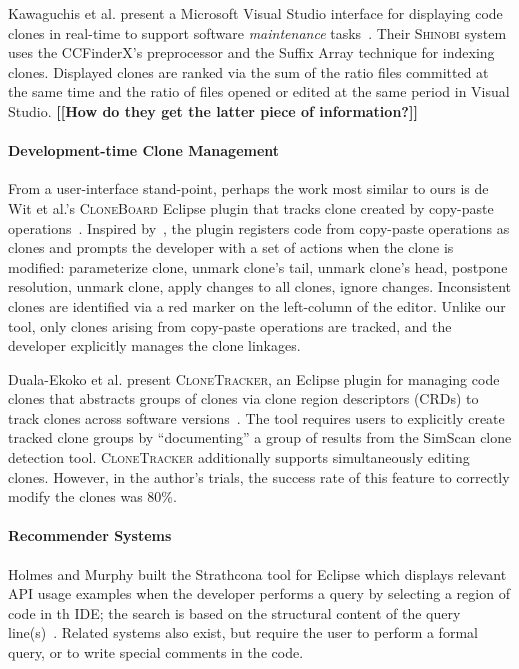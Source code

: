 \documentclass[preprint,10pt]{sigplanconf}
\newcommand{\todo}[1]{{\bfseries [[#1]]}}
\begin{document}
Kawaguchis et al. present a  
Microsoft Visual Studio interface for
displaying code clones in real-time to support software
\emph{maintenance} tasks~\cite{Kawaguchi2009,Yamashina2008}. Their
\textsc{Shinobi} system uses the CCFinderX's preprocessor and the Suffix Array
technique for indexing clones. Displayed clones are ranked via the sum
of the ratio files committed at the same time and the ratio of files
opened or edited at the same period in Visual Studio. \todo{How do
  they get the latter piece of information?}

\paragraph{Development-time Clone Management}

From a user-interface stand-point, perhaps the work most similar to
ours is de Wit et al.'s \textsc{CloneBoard} Eclipse plugin that tracks
clone created by copy-paste operations~\cite{deWit2009}. Inspired
by~\cite{Mann2006}, the plugin registers code from copy-paste
operations as clones and prompts the developer with a set of actions
when the clone is modified: parameterize clone, unmark clone's tail,
unmark clone's head, postpone resolution, unmark clone, apply changes
to all clones, ignore changes. Inconsistent clones are identified via
a red marker on the left-column of the editor. Unlike our tool, only
clones arising from copy-paste operations are tracked, and the
developer explicitly manages the clone linkages.

Duala-Ekoko et al. present \textsc{CloneTracker}, an Eclipse plugin
for managing code clones that abstracts groups of clones via clone
region descriptors (CRDs) to track clones across software
versions~\cite{Duala-Ekoko2007}. The tool requires users to explicitly
create tracked clone groups by ``documenting'' a group of results from
the SimScan clone detection tool. \textsc{CloneTracker} additionally
supports simultaneously editing clones. However, in the author's
trials, the success rate of this feature to correctly modify the
clones was 80\%.

\paragraph{Recommender Systems}

Holmes and Murphy built the Strathcona tool for Eclipse which displays
relevant API usage examples when the developer performs a query by
selecting a region of code in th IDE; the search is based on the
structural content of the query line(s)~\cite{Holmes2005}. 
Related systems also exist, but require the user to
perform a formal query, or to write special comments in the code.
\end{document}
